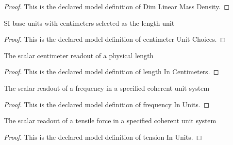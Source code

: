 \begin{proof}
  This is the declared model definition of Dim Linear Mass Density.
\end{proof}
\begin{definition}
  \label{def:physics:phyx-mini-0180:phyxminiproblems-problemphyxmini0180-centimeterunitchoices}
  SI base units with centimeters selected as the length unit
\end{definition}
\begin{proof}
  This is the declared model definition of centimeter Unit Choices.
\end{proof}
\begin{definition}
  \label{def:physics:phyx-mini-0180:phyxminiproblems-problemphyxmini0180-lengthincentimeters}
  The scalar centimeter readout of a physical length
\end{definition}
\begin{proof}
  This is the declared model definition of length In Centimeters.
\end{proof}
\begin{definition}
  \label{def:physics:phyx-mini-0180:phyxminiproblems-problemphyxmini0180-frequencyinunits}
  The scalar readout of a frequency in a specified coherent unit system
\end{definition}
\begin{proof}
  This is the declared model definition of frequency In Units.
\end{proof}
\begin{definition}
  \label{def:physics:phyx-mini-0180:phyxminiproblems-problemphyxmini0180-tensioninunits}
  The scalar readout of a tensile force in a specified coherent unit system
\end{definition}
\begin{proof}
  This is the declared model definition of tension In Units.
\end{proof}
